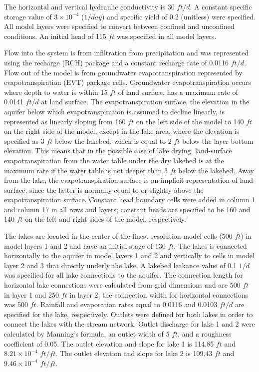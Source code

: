 

The horizontal and vertical hydraulic conductivity is 30 $ft/d$. A constant specific storage value of $3 \times 10^{-4}$ ($1/day$) and specific yield of 0.2 (unitless) were specified. All model layers were specified to convert between confined and unconfined conditions. An initial head of 115 $ft$ was specified in all model layers.

Flow into the system is from infiltration from precipitation and was represented using the recharge (RCH) package and a constant recharge rate of 0.0116 $ft/d$. Flow out of the model is from groundwater evapotranspiration represented by evapotranspiration (EVT) package cells. Groundwater evapotranspiration occurs where depth to water is within 15 $ft$ of land surface, has a maximum rate of 0.0141 $ft/d$ at land surface. The evapotranspiration surface, the elevation in the aquifer below which evapotranspiration is assumed to decline linearly, is represented as linearly sloping from 160 $ft$ on the left side of the model to 140 $ft$ on the right side of the model, except in the lake area, where the elevation is specified as 3 $ft$ below the lakebed, which is equal to 2 $ft$ below the layer bottom elevation. This means that in the possible case of lake drying, land-surface evapotranspiration from the water table under the dry lakebed is at the maximum rate if the water table is not deeper than 3 $ft$ below the lakebed. Away from the lake, the evapotranspiration surface is an implicit representation of land surface, since the latter is normally equal to or slightly above the evapotranspiration surface. Constant head boundary cells were added in column 1 and column 17 in all rows and layers; constant heads are specified to be 160 and 140 $ft$ on the left and right sides of the model, respectively.

The lakes are located in the center of the finest resolution model cells (500 $ft$) in model layers 1 and 2 and have an initial stage of 130 $ft$. The lakes is connected horizontally to the aquifer in model layers 1 and 2 and vertically to cells in model layer 2 and 3 that directly underly the lake. A lakebed leakance value of 0.1 $1/d$ was specified for all lake connections to the aquifer. The connection length for horizontal lake connections were calculated from grid dimensions and are 500 $ft$ in layer 1 and 250 $ft$ in layer 2; the connection width for horizontal connections was 500 $ft$. Rainfall and evaporation rates equal to 0.0116 and 0.0103 $ft/d$ are specified for the lake, respectively. Outlets were defined for both lakes in order to connect the lakes with the stream network. Outlet discharge for lake 1 and 2 were calculated by Manning's formula, an outlet width of 5 $ft$, and a roughness coefficient of 0.05. The outlet elevation and slope for lake 1 is 114.85 $ft$ and $8.21 \times 10^{-4}$ $ft/ft$. The outlet elevation and slope for lake 2 is 109.43 $ft$ and $9.46 \times 10^{-4}$ $ft/ft$. 

